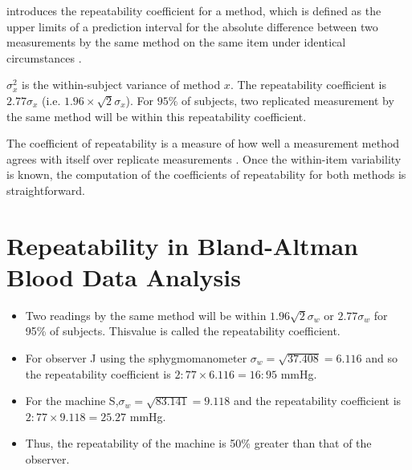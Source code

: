 \documentclass[12pt, a4paper]{article}
\begin{document}
	\citet{BA99} introduces the repeatability coefficient for a method, which is defined as the upper limits of a prediction interval for the absolute difference between two measurements by the same
method on the same item under identical circumstances \citep{BXC2008}.

$\sigma^2_{x}$ is the within-subject variance of method $x$. The repeatability coefficient is $2.77 \sigma_{x}$ (i.e. $1.96 \times \sqrt{2} \sigma_{x}$). For $95\%$ of subjects, two replicated measurement by the same method will be within this repeatability coefficient.

The coefficient of repeatability is a measure of how well a
measurement method agrees with itself over replicate measurements
\citep{BA99}. Once the within-item variability is known, the
computation of the coefficients of repeatability for both methods
is straightforward.


\section{Repeatability in Bland-Altman Blood Data Analysis}
\begin{itemize}
	\item Two readings by the same method will be within $1.96
	\sqrt{2} \sigma_w $ or $2.77 \sigma_w $ for 95\% of subjects. Thisvalue is called the repeatability coefficient.
	
	\item For observer J using the sphygmomanometer $ \sigma_w = \sqrt{37.408} = 6.116$ and so the repeatability coefficient is
	$2:77 \times 6.116 = 16:95$ mmHg.
	
	\item For the machine S,$ \sigma_w = \sqrt{83.141} = 9.118$ and the repeatability coefficient is $2:77 \times 9.118 = 25.27$ mmHg.
	
	\item Thus, the repeatability of the machine is 50\% greater than that of the observer.
\end{itemize}
\end{document}
